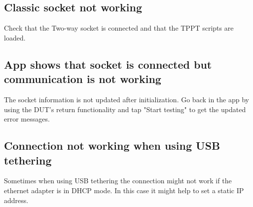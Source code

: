 \subsection{Classic socket not working}
Check that the Two-way socket is connected and that the TPPT scripts are loaded.

\subsection{App shows that socket is connected but communication is not working}
The socket information is not updated after initialization. Go back in the app by using the DUT's return functionality and tap "Start testing" to get the updated error messages.

\subsection{Connection not working when using USB tethering}
Sometimes when using USB tethering the connection might not work if the ethernet adapter is in DHCP mode. In this case it might help to set a static IP address.